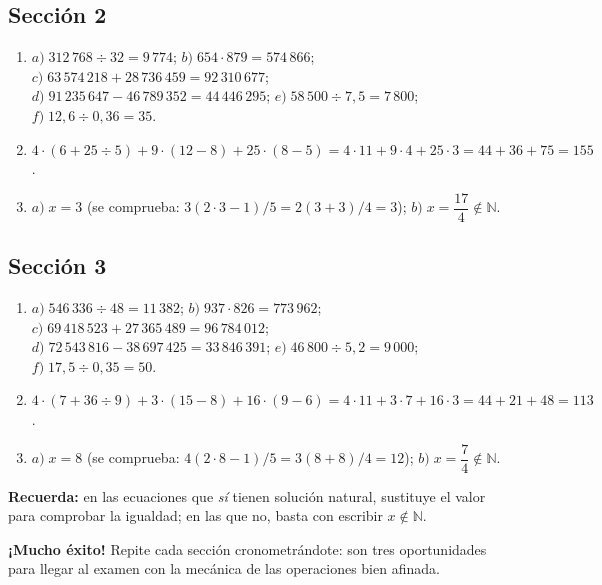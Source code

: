 \documentclass[12pt, letterpaper]{article}
\newcommand{\N}{\mathbb{N}}
\begin{document}
  \subsection*{Sección 2}
  \begin{enumerate}[leftmargin=*, label=\textbf{\arabic*.}]
    \item
          $a)\; 312\,768 \div 32 = 9\,774$; \quad
          $b)\; 654 \cdot 879 = 574\,866$; \quad
          $c)\; 63\,574\,218 + 28\,736\,459 = 92\,310\,677$; \\
          $d)\; 91\,235\,647 - 46\,789\,352 = 44\,446\,295$; \quad
          $e)\; 58\,500 \div 7{,}5 = 7\,800$; \quad
          $f)\; 12{,}6 \div 0{,}36 = 35$.
    \item $4 \cdot (6 + 25 \div 5) + 9 \cdot (12 - 8) + 25 \cdot (8 - 5) = 4 \cdot 11 + 9 \cdot 4 + 25 \cdot 3 = 44 + 36 + 75 = 155$.
    \item
          $a)\; x = 3$ (se comprueba: $3(2 \cdot 3 - 1)/5 = 2(3 + 3)/4 = 3$); \quad
          $b)\; x = \dfrac{17}{4} \notin \N$.
  \end{enumerate}

  \subsection*{Sección 3}
  \begin{enumerate}[leftmargin=*, label=\textbf{\arabic*.}]
    \item
          $a)\; 546\,336 \div 48 = 11\,382$; \quad
          $b)\; 937 \cdot 826 = 773\,962$; \quad
          $c)\; 69\,418\,523 + 27\,365\,489 = 96\,784\,012$; \\
          $d)\; 72\,543\,816 - 38\,697\,425 = 33\,846\,391$; \quad
          $e)\; 46\,800 \div 5{,}2 = 9\,000$; \quad
          $f)\; 17{,}5 \div 0{,}35 = 50$.
    \item $4 \cdot (7 + 36 \div 9) + 3 \cdot (15 - 8) + 16 \cdot (9 - 6) = 4 \cdot 11 + 3 \cdot 7 + 16 \cdot 3 = 44 + 21 + 48 = 113$.
    \item
          $a)\; x = 8$ (se comprueba: $4(2 \cdot 8 - 1)/5 = 3(8 + 8)/4 = 12$); \quad
          $b)\; x = \dfrac{7}{4} \notin \N$.
  \end{enumerate}

  \vspace{6pt}
  \begin{cuadroinfo}
    \small
    \textbf{Recuerda:} en las ecuaciones que \emph{sí} tienen solución natural, sustituye el valor para comprobar la igualdad; en las que no, basta con escribir $x \notin \N$.
  \end{cuadroinfo}
\fi

\vspace{10pt}
\begin{cuadroinfo}
  \small
  \textbf{¡Mucho éxito!} Repite cada sección cronometrándote: son tres oportunidades para llegar al examen con la mecánica de las operaciones bien afinada.
\end{cuadroinfo}
\end{document}

